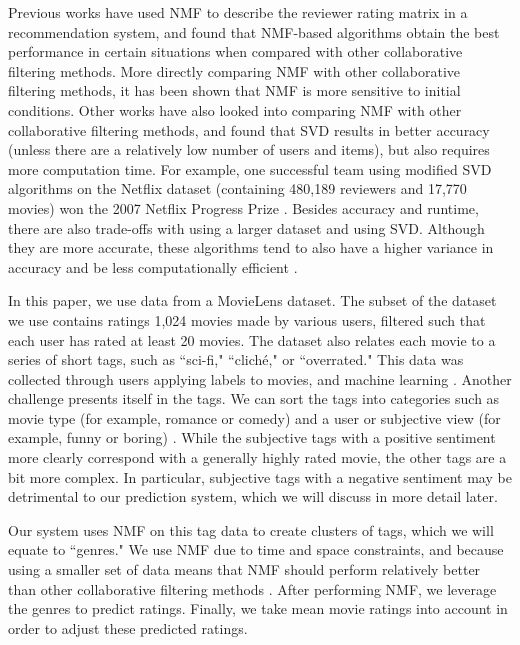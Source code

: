 \documentclass[letterpaper, 10 pt, conference]{ieeeconf}  %
\begin{document}
Previous works \cite{nmfratings} have used NMF to describe the reviewer rating matrix in a recommendation system, and found that NMF-based algorithms obtain the best performance in certain situations when compared with other collaborative filtering methods. More directly comparing NMF with other collaborative filtering methods, it has been shown \cite{nmfratings} that NMF is more sensitive to initial conditions. Other works \cite{cfcompare} have also looked into comparing NMF with other collaborative filtering methods, and found that SVD results in better accuracy (unless there are a relatively low number of users and items), but also requires more computation time. For example, one successful team using modified SVD algorithms on the Netflix dataset (containing 480,189 reviewers and 17,770 movies) won the 2007 Netflix Progress Prize \cite{netflix}. Besides accuracy and runtime, there are also trade-offs with using a larger dataset and using SVD. Although they are more accurate, these algorithms tend to also have a higher variance in accuracy and be less computationally efficient \cite{cfcompare}.

In this paper, we use data from a MovieLens dataset. The subset of the dataset we use contains ratings 1,024 movies made by various users, filtered such that each user has rated at least 20 movies.
The dataset also relates each movie to a series of short tags, such as ``sci-fi," ``cliché," or ``overrated." This data was collected through users applying labels to movies, and machine learning \cite{lenskitdata}. Another challenge presents itself in the tags. We can sort the tags into categories such as movie type (for example, romance or comedy) and a user or subjective view (for example, funny or boring) \cite{tags}. While the subjective tags with a positive sentiment more clearly correspond with a generally highly rated movie, the other tags are a bit more complex. In particular, subjective tags with a negative sentiment may be detrimental to our prediction system, which we will discuss in more detail later.


Our system uses NMF on this tag data to create clusters of tags, which we will equate to ``genres." We use NMF due to time and space constraints, and because using a smaller set of data means that NMF should perform relatively better than other collaborative filtering methods \cite{cfcompare}.  After performing NMF, we leverage the genres to predict ratings. Finally, we take mean movie ratings into account in order to adjust these predicted ratings.
\end{document}
